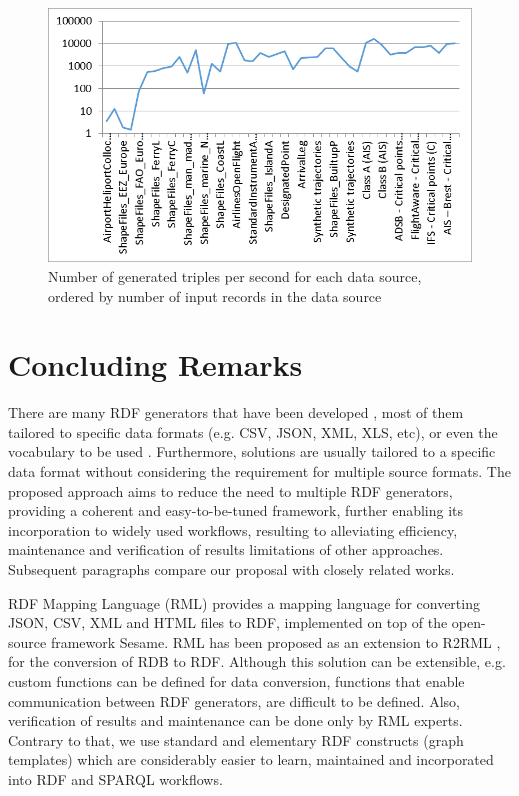 \documentclass{sig-alternate}
\makeatletter
\def\maxwidth#1{\ifdim\Gin@nat@width>#1 #1\else\Gin@nat@width\fi}
\makeatother
\begin{document}
\begin{figure}[h!]
\centering
\includegraphics[width=\maxwidth{\columnwidth}]{./img/image4.png}
\cprotect\caption{  Number of generated triples per second for each data source, ordered by number of input records in the data source}
\label{_Ref490495999}
\end{figure}


\section{Concluding Remarks}

There are many RDF generators that have been developed  \cite{_Ref490495701}, most of them tailored to specific data formats (e.g. CSV, JSON, XML, XLS, etc), or even the vocabulary to be used  \cite{_Ref490495811}. Furthermore, solutions are usually tailored to a specific data format without considering the requirement for multiple source formats. The proposed approach aims to reduce the need to multiple RDF generators, providing a coherent and easy-to-be-tuned framework, further enabling its incorporation to widely used workflows, resulting to alleviating efficiency, maintenance and verification of results limitations of other approaches. Subsequent paragraphs compare our proposal with closely related works.

RDF Mapping Language (RML)  \cite{_Ref490495825} provides a mapping language for converting JSON, CSV, XML and HTML files to RDF, implemented on top of the open-source framework Sesame. RML has been proposed as an extension to R2RML  \cite{_Ref490495836}, for the conversion of RDB to RDF. Although this solution can be extensible, e.g. custom functions can be defined for data conversion, functions that enable communication between RDF generators, are difficult to be defined. Also, verification of results and maintenance can be done only by RML experts. Contrary to that, we use standard and elementary RDF constructs (graph templates) which are considerably easier to learn, maintained and incorporated into RDF and SPARQL workflows.
\end{document}

